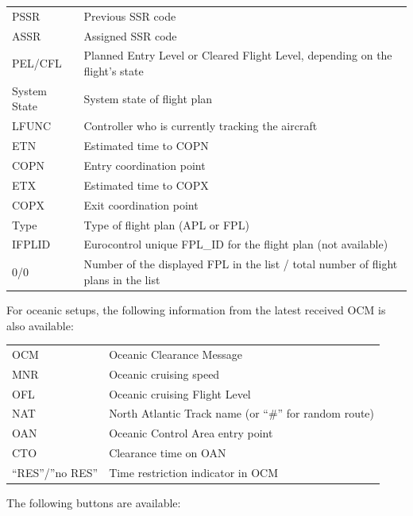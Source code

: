 \documentclass[a4paper,oneside,11pt]{memoir}
\begin{document}
\begin{longtable}{p{2.5cm} p{10cm}}
    PSSR          & Previous SSR code\\
    ASSR          & Assigned SSR code\\
    PEL/CFL       & Planned Entry Level or Cleared Flight Level, depending on the flight’s state\\
    System State  & System state of flight plan\\
    LFUNC         & Controller who is currently tracking the aircraft\\
    ETN           & Estimated time to COPN\\
    COPN          & Entry coordination point\\
    ETX           & Estimated time to COPX\\
    COPX          & Exit coordination point\\
    Type          & Type of flight plan (APL or FPL)\\
    IFPLID        & Eurocontrol unique FPL\_ID for the flight plan (not available)\\
    0/0           & Number of the displayed FPL in the list / total number of flight plans in the list\\
\end{longtable}

For oceanic setups, the following information from the latest received OCM is also available:

\begin{longtable}{p{2.5cm} p{10cm}}
  OCM             & Oceanic Clearance Message\\
  MNR             & Oceanic cruising speed\\
  OFL             & Oceanic cruising Flight Level\\
  NAT             & North Atlantic Track name (or “\#” for random route)\\
  OAN             & Oceanic Control Area entry point\\
  CTO             & Clearance time on OAN\\
  “RES”/”no RES”  & Time restriction indicator in OCM\\
\end{longtable}

The following buttons are available:

\bigskip
\end{document}
